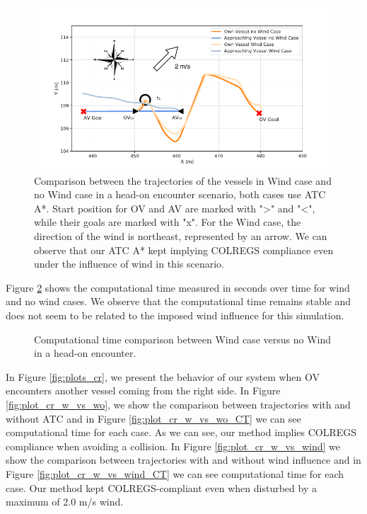         \begin{figure}[H]
            \centering
            \includegraphics[width=\textwidth]{figs/Chap5/plot_ho_w_vs_wind.pdf}
            \caption{Comparison between the trajectories of the vessels in Wind case and no Wind case in a head-on encounter scenario, both cases use \ac{ATC} A*. Start position for \ac{OV} and \ac{AV} are marked with ">" and "<", while their goals are marked with "x". For the Wind case, the direction of the wind is northeast, represented by an arrow. We can observe that our \ac{ATC} A* kept implying COLREGS compliance even under the influence of wind in this scenario.}
            \label{fig:plot_ho_w_vs_wind}
        \end{figure}
        
        Figure \ref{fig:plot_ho_w_vs_wind_CT} shows the computational time measured in seconds over time for wind and no wind cases. We observe that the computational time remains stable and does not seem to be related to the imposed wind influence for this simulation.
        \begin{figure}[H]
            \centering
            
            \caption{Computational time comparison between Wind case versus no Wind in a head-on encounter.}
            \label{fig:plot_ho_w_vs_wind_CT}
        \end{figure}
        
        In Figure \ref{fig:plots_cr}, we present the behavior of our system when \ac{OV} encounters another vessel coming from the right side. In Figure \ref{fig:plot_cr_w_vs_wo}, we show the comparison between trajectories with and without ATC and in Figure \ref{fig:plot_cr_w_vs_wo_CT} we can see computational time for each case. As we can see, our method implies COLREGS compliance when avoiding a collision. In Figure \ref{fig:plot_cr_w_vs_wind} we show the comparison between trajectories with and without wind influence and in Figure \ref{fig:plot_cr_w_vs_wind_CT} we can see computational time for each case. Our method kept COLREGS-compliant even when disturbed by a maximum of 2.0 m/s wind.
        
